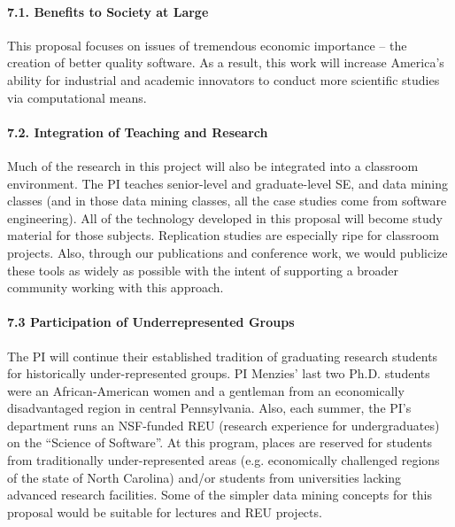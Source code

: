 \paragraph{7.1. Benefits to Society at Large}
This proposal focuses on issues of
tremendous economic importance -- the creation of better quality software.
As a result, this work will increase America's ability for industrial and academic innovators to conduct
more scientific studies via computational means.  
 

\paragraph{7.2. Integration of Teaching and Research}
Much of the research in this project will also be integrated into a
classroom environment.  The PI teaches senior-level and graduate-level
SE, and data mining classes (and in those data mining
classes, all the case studies come from software engineering). All of
the technology developed in this proposal will become study
material for those subjects.  Replication studies are especially ripe
for classroom projects.  Also, through our publications and conference
work, we would publicize these tools as widely as possible with the
intent of supporting a broader community working with this approach.

\paragraph{7.3 Participation of Underrepresented
  Groups} The PI will continue their established tradition of
graduating research students for historically under-represented
groups.  PI Menzies' last two Ph.D. students were an African-American
women and a gentleman from an economically disadvantaged region
in central Pennsylvania.  Also, each summer, the PI's department runs an NSF-funded REU
 (research experience for undergraduates)
on the ``Science of Software''.
 At this
program, places are reserved for students from traditionally
under-represented areas (e.g. economically challenged regions of the
state of North Carolina) and/or students from universities
lacking advanced research  facilities.
Some of the simpler data mining concepts for this proposal would be suitable for lectures and REU projects.



%
